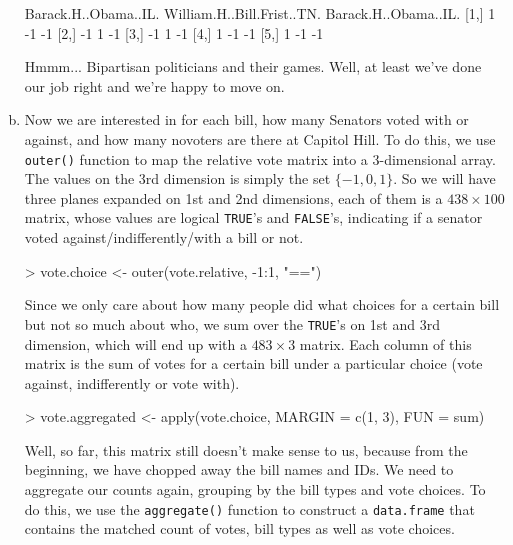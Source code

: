 \documentclass{article}
\begin{document}
\begin{enumerate}[(a)]
\begin{Schunk}
\begin{Soutput}
     Barack.H..Obama..IL. William.H..Bill.Frist..TN. Barack.H..Obama..IL.
[1,]                    1                         -1                   -1
[2,]                   -1                          1                   -1
[3,]                   -1                          1                   -1
[4,]                    1                         -1                   -1
[5,]                    1                         -1                   -1
\end{Soutput}
\end{Schunk}
    Hmmm... Bipartisan politicians and their games. Well, at least we've done our job right and we're happy to move on.

    \item Now we are interested in for each bill, how many Senators voted with or against, and how many novoters are there at Capitol Hill. To do this, we use \verb=outer()= function to map the relative vote matrix into a 3-dimensional array. The values on the 3rd dimension is simply the set $\{-1, 0, 1\}$. So we will have three planes expanded on 1st and 2nd dimensions, each of them is a $438 \times 100$ matrix, whose values are logical \verb=TRUE='s and \verb=FALSE='s, indicating if a senator voted against/indifferently/with a bill or not.
\begin{Schunk}
\begin{Sinput}
> vote.choice <- outer(vote.relative, -1:1, "==")
\end{Sinput}
\end{Schunk}
    Since we only care about how many people did what choices for a certain bill but not so much about who, we sum over the \verb=TRUE='s on 1st and 3rd dimension, which will end up with a $483 \times 3$ matrix. Each column of this matrix is the sum of votes for a certain bill under a particular choice (vote against, indifferently or vote with).
\begin{Schunk}
\begin{Sinput}
> vote.aggregated <- apply(vote.choice, MARGIN = c(1, 3), FUN = sum)
\end{Sinput}
\end{Schunk}

    Well, so far, this matrix still doesn't make sense to us, because from the beginning, we have chopped away the bill names and IDs. We need to aggregate our counts again, grouping by the bill types and vote choices. To do this, we use the \verb=aggregate()= function to construct a \verb=data.frame= that contains the matched count of votes, bill types as well as vote choices.
    

\end{enumerate}
\end{document}

